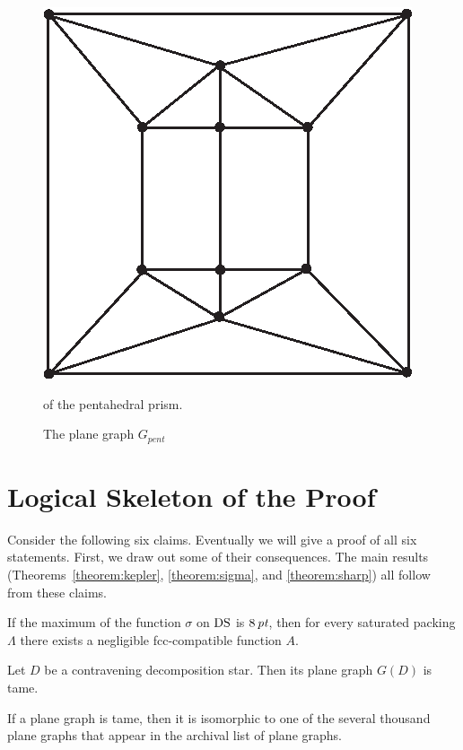 \begin{figure}[htb]
  \centering
  \includegraphics{PS/gpent.eps}
  \caption{The plane graph $G_{pent}$}
   of the pentahedral prism.
  \label{fig:pentahedral}
\end{figure}

\section{Logical Skeleton of the Proof}
\label{sec:logic}

Consider the following six claims.  Eventually we will give a
proof of all six statements.  First, we draw out some of their
consequences.  The main results (Theorems~\ref{theorem:kepler},
\ref{theorem:sigma}, and \ref{theorem:sharp}) all follow from
these claims.

\begin{claim}\label{claim-A}
If the maximum of the function $\sigma$ on ${\operatorname{DS}}$ is $8\,\hbox{\it pt}$,
then for every saturated packing $\Lambda$ there exists a
negligible fcc-compatible function $A$.
\end{claim}

\begin{claim}\label{claim-B}
Let $D$ be a contravening decomposition star. Then its plane graph
$G(D)$ is tame.
\end{claim} %

\begin{claim}\label{claim-C}
If a plane graph is tame, then it is isomorphic to one of the
several thousand plane graphs that appear in the archival list of
plane graphs.
\end{claim} %

